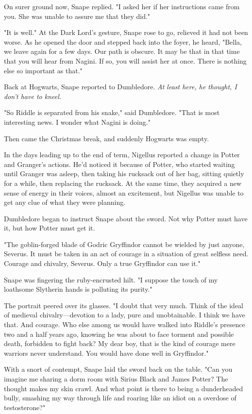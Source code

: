 On surer ground now, Snape replied. "I asked her if her instructions came from you. She was unable to assure me that they did."

"It is well." At the Dark Lord's gesture, Snape rose to go, relieved it had not been worse. As he opened the door and stepped back into the foyer, he heard, "Bella, we leave again for a few days. Our path is obscure. It may be that in that time that you will hear from Nagini. If so, you will assist her at once. There is nothing else so important as that."

Back at Hogwarts, Snape reported to Dumbledore. \emph{At least here, he thought, I don't have to kneel.}

"So Riddle is separated from his snake," said Dumbledore. "That is most interesting news. I wonder what Nagini is doing."

Then came the Christmas break, and suddenly Hogwarts was empty.

In the days leading up to the end of term, Nigellus reported a change in Potter and Granger's actions. He'd noticed it because of Potter, who started waiting until Granger was asleep, then taking his rucksack out of her bag, sitting quietly for a while, then replacing the rucksack. At the same time, they acquired a new sense of energy in their voices, almost an excitement, but Nigellus was unable to get any clue of what they were planning.

Dumbledore began to instruct Snape about the sword. Not why Potter must have it, but how Potter must get it.

"The goblin-forged blade of Godric Gryffindor cannot be wielded by just anyone, Severus. It must be taken in an act of courage in a situation of great selfless need. Courage and chivalry, Severus. Only a true Gryffindor can use it."

Snape was fingering the ruby-encrusted hilt. "I suppose the touch of my loathsome Slytherin hands is polluting its purity."

The portrait peered over its glasses. "I doubt that very much. Think of the ideal of medieval chivalry—devotion to a lady, pure and unobtainable. I think we have that. And courage. Who else among us would have walked into Riddle's presence two and a half years ago, knowing he was about to face torment and possible death, forbidden to fight back? My dear boy, that is the kind of courage mere warriors never understand. You would have done well in Gryffindor."

With a snort of contempt, Snape laid the sword back on the table. "Can you imagine me sharing a dorm room with Sirius Black and James Potter? The thought makes my skin crawl. And what point is there to being a dunderheaded bully, smashing my way through life and roaring like an idiot on a overdose of testosterone?"

